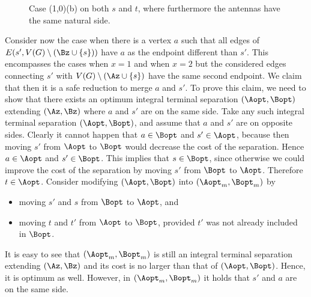 \begin{figure}[H]
	\centering
	\clearpage{}
\figspace
\clearpage{}
	\caption{Case (1,0)(b) on both $s$ and $t$, where furthermore the antennas have the same natural side.}
\label{fig:case-10-b-two-antennas}
\end{figure}


Consider now the case when there is a vertex $a$ such that all edges of $E(s',V(G)\setminus (\Bz\cup \{s\}))$ have $a$ as the endpoint different than $s'$. This encompasses the cases when $x=1$ and when $x=2$ but the considered edges connecting $s'$ with $V(G)\setminus (\Az\cup \{s\})$ have the same second endpoint. We claim that then it is a safe reduction to merge $a$ and $s'$. To prove this claim, we need to show that there exists an optimum integral terminal separation $(\Aopt,\Bopt)$ extending $(\Az,\Bz)$ where $a$ and $s'$ are on the same side. Take any such integral terminal separation $(\Aopt,\Bopt)$, and assume that $a$ and $s'$ are on opposite sides. Clearly it cannot happen that $a\in \Bopt$ and $s'\in \Aopt$, because then moving $s'$ from $\Aopt$ to $\Bopt$ would decrease the cost of the separation. Hence $a\in \Aopt$ and $s'\in \Bopt$. This implies that $s\in\Bopt$, since otherwise we could improve the cost of the separation by moving $s'$ from $\Bopt$ to $\Aopt$. Therefore $t\in \Aopt$. Consider modifying $(\Aopt,\Bopt)$ into $(\Aopt_m,\Bopt_m)$ by 
\begin{itemize}
\item moving $s'$ and $s$ from $\Bopt$ to $\Aopt$, and
\item moving $t$ and $t'$ from $\Aopt$ to $\Bopt$, provided $t'$ was not already included in $\Bopt$.
\end{itemize}
It is easy to see that $(\Aopt_m,\Bopt_m)$ is still an integral terminal separation extending $(\Az,\Bz)$ and its cost is no larger than that of $(\Aopt,\Bopt)$. Hence, it is optimum as well. However, in $(\Aopt_m,\Bopt_m)$ it holds that $s'$ and $a$ are on the same side.

